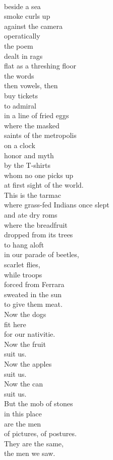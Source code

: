 \documentclass[smalldemyvopaper,11pt,twoside,onecolumn,openright,extrafontsizes]{memoir}
\newlength\drop
\begin{document}
\\beside a sea
\\smoke curls up
\\against the camera
\\operatically
\\the poem
\\dealt in rags
\\flat as a threshing floor
\\the words
\\then vowels, then
\\buy tickets
\\to admiral
\\in a line of fried eggs
\\where the masked
\\saints of the metropolis
\\on a clock
\\honor and myth
\\by the T-shirts
\\whom no one picks up
\\at first sight of the world.
\\This is the tarmac
\\where grass-fed Indians once slept
\\and ate dry roms
\\where the breadfruit
\\dropped from its trees
\\to hang aloft
\\in our parade of beetles,
\\scarlet flies,
\\while troops
\\forced from Ferrara
\\sweated in the sun
\\to give them meat.
\\Now the dogs
\\fit here
\\for our nativitie.
\\Now the fruit
\\suit us.
\\Now the apples
\\suit us.
\\Now the can
\\suit us.
\\But the mob of stones
\\in this place
\\are the men
\\of pictures, of postures.
\\They are the same,
\\the men we saw.
\end{document}
